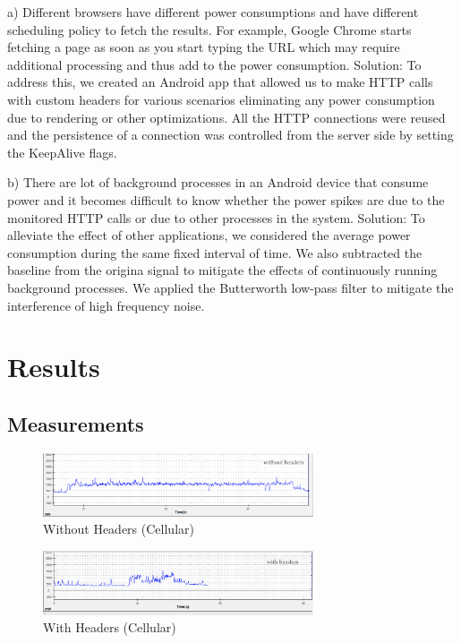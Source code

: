 \documentclass{sigplanconf}
\begin{document}
a) Different browsers have different power consumptions and have different scheduling policy to fetch the results. For example, Google Chrome starts fetching a page as soon as you start typing the URL which may require additional processing and thus add to the power consumption.
Solution: To address this, we created an Android app that allowed us to make HTTP calls with custom headers for various scenarios eliminating any power consumption due to rendering or other optimizations. All the HTTP connections were reused and the persistence of a connection was controlled from the server side by setting the KeepAlive flags.

b) There are lot of background processes in an Android device that consume power and it becomes difficult to know whether the power spikes are due to the monitored HTTP calls or due to other processes in the system.
Solution: To alleviate the effect of other applications, we considered the average power consumption during the same fixed interval of time. We also subtracted the baseline from the origina signal to mitigate the effects of continuously running background processes. We applied the Butterworth low-pass filter to mitigate the interference of high frequency noise.


\section{Results}

\subsection{Measurements}

\begin{figure}[ht!]
\centering
\includegraphics[width=80mm]{cellular_withoutheaders.png}
\caption{Without Headers (Cellular) }
\label{fig:sp_gd_mnist}
\end{figure}

\begin{figure}[ht!]
\centering
\includegraphics[width=80mm]{cellular_withheaders.png}
\caption{With Headers (Cellular) }
\label{fig:sp_gd_mnist}
\end{figure}
\end{document}
